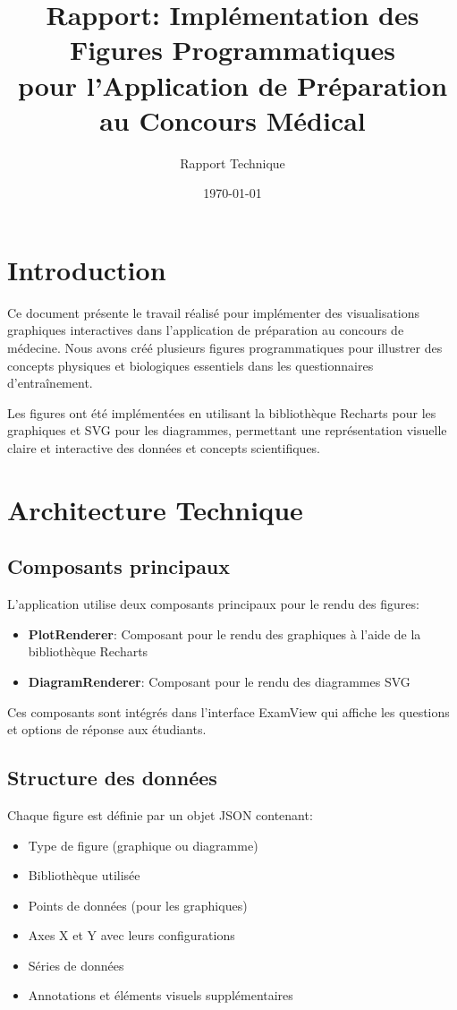 \documentclass{article}
\title{Rapport: Implémentation des Figures Programmatiques\\
pour l'Application de Préparation au Concours Médical}
\author{Rapport Technique}
\date{\today}
\begin{document}
\maketitle

\section{Introduction}

Ce document présente le travail réalisé pour implémenter des visualisations graphiques interactives dans l'application de préparation au concours de médecine. Nous avons créé plusieurs figures programmatiques pour illustrer des concepts physiques et biologiques essentiels dans les questionnaires d'entraînement.

Les figures ont été implémentées en utilisant la bibliothèque Recharts pour les graphiques et SVG pour les diagrammes, permettant une représentation visuelle claire et interactive des données et concepts scientifiques.

\section{Architecture Technique}

\subsection{Composants principaux}

L'application utilise deux composants principaux pour le rendu des figures:

\begin{itemize}
    \item \textbf{PlotRenderer}: Composant pour le rendu des graphiques à l'aide de la bibliothèque Recharts
    \item \textbf{DiagramRenderer}: Composant pour le rendu des diagrammes SVG
\end{itemize}

Ces composants sont intégrés dans l'interface ExamView qui affiche les questions et options de réponse aux étudiants.

\subsection{Structure des données}

Chaque figure est définie par un objet JSON contenant:

\begin{itemize}
    \item Type de figure (graphique ou diagramme)
    \item Bibliothèque utilisée
    \item Points de données (pour les graphiques)
    \item Axes X et Y avec leurs configurations
    \item Séries de données
    \item Annotations et éléments visuels supplémentaires
\end{itemize}
\newpage
\end{document}
